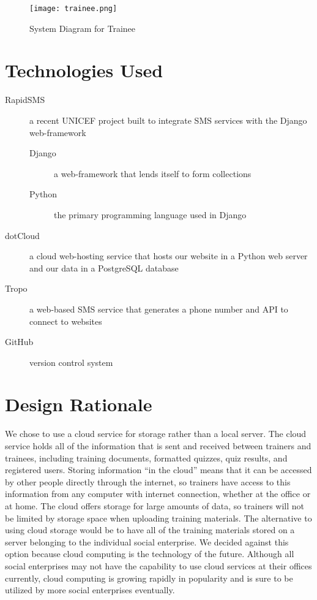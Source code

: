\begin{figure}[H]
	\centering
	\texttt{[image: trainee.png]}
	\caption{System Diagram for Trainee}
\end{figure}

\section{Technologies Used}
\begin{description}
	\item[RapidSMS] a recent UNICEF project built to integrate SMS services with the Django web-framework
	\begin{description}
		\item[Django] a web-framework that lends itself to form collections
		\item[Python] the primary programming language used in Django
	\end{description}
	\item[dotCloud] a cloud web-hosting service that hosts our website in a Python web server and our data in a PostgreSQL database
	\item[Tropo] a web-based SMS service that generates a phone number and API to connect to websites
	\item[GitHub] version control system
\end{description}

\section{Design Rationale}

We chose to use a cloud service for storage rather than a local server. The cloud service holds all of the information that is sent and received between trainers and trainees, including training documents, formatted quizzes, quiz results, and registered users. Storing information “in the cloud” means that it can be accessed by other people directly through the internet, so trainers have access to this information from any computer with internet connection, whether at the office or at home. The cloud offers storage for large amounts of data, so trainers will not be limited by storage space when uploading training materials. The alternative to using cloud storage would be to have all of the training materials stored on a server belonging to the individual social enterprise. We decided against this option because cloud computing is the technology of the future. Although all social enterprises may not have the capability to use cloud services at their offices currently, cloud computing is growing rapidly in popularity and is sure to be utilized by more social enterprises eventually.

